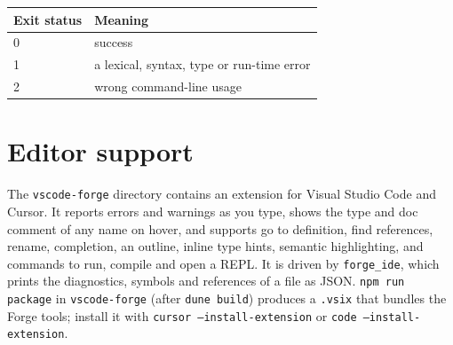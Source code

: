\begin{center}
\small
\begin{tabular}{@{}ll@{}}
\toprule
\textbf{Exit status} & \textbf{Meaning} \\
\midrule
0 & success \\
1 & a lexical, syntax, type or run-time error \\
2 & wrong command-line usage \\
\bottomrule
\end{tabular}
\end{center}

\section{Editor support}

The \texttt{vscode-forge} directory contains an extension for Visual Studio
Code and Cursor. It reports errors and warnings as you type, shows the type
and doc comment of any name on hover, and supports go to definition, find
references, rename, completion, an outline, inline type hints, semantic
highlighting, and commands to run, compile and open a REPL. It is driven by
\texttt{forge\_ide}, which prints the diagnostics, symbols and references of a
file as JSON. \texttt{npm run package} in \texttt{vscode-forge} (after
\texttt{dune build}) produces a \texttt{.vsix} that bundles the Forge tools;
install it with \texttt{cursor --install-extension} or
\texttt{code --install-extension}.
